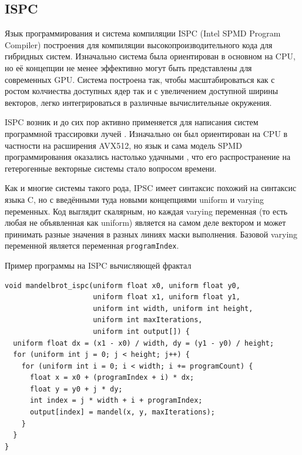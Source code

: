 \subsection{ISPC}\label{subsec:overview/vectorapi/ispc}

Язык программирования и система компиляции ISPC (Intel SPMD Program Compiler) построения для компиляции высокопроизводительного кода для гибридных систем. Изначально система была ориентирован в основном на CPU, но её концепции не менее эффективно могут быть представлены для современных GPU. Система построена так, чтобы масштабироваться как с ростом колчиества доступных ядер так и с увеличением доступной ширины векторов, легко интегрироваться в различные вычислительные окружения.

ISPC возник и до сих пор активно применяется для написания систем программной трассировки лучей \cite{moreau2019dynamic}. Изначально он был ориентирован на CPU \cite{pharr2013ray} в частности на расширения AVX512, но язык и сама модель SPMD программирования оказались настолько удачными \cite{pharr2018guest}, что его распространение на гетерогенные векторные системы стало вопросом времени.

Как и многие системы такого рода, IPSC имеет синтаксис похожий на синтаксис языка C, но с введёнными туда новыми концепциями uniform и varying переменных. Код выглядит скалярным, но каждая varying переменная (то есть любая не объявленная как uniform) является на самом деле вектором и может принимать разные значения в разных линиях маски выполнения. Базовой varying переменной является переменная \lstinline!programIndex!.

\begin{ListingEnv}[!h]
    \captiondelim{ } 
    \caption{Пример программы на ISPC вычисляющей фрактал}\label{lst:ispcmandel}
    \begin{lstlisting}[language={[ISO]C++}]
void mandelbrot_ispc(uniform float x0, uniform float y0,
                     uniform float x1, uniform float y1,
                     uniform int width, uniform int height,
                     uniform int maxIterations,
                     uniform int output[]) {
  uniform float dx = (x1 - x0) / width, dy = (y1 - y0) / height;
  for (uniform int j = 0; j < height; j++) {
    for (uniform int i = 0; i < width; i += programCount) {
      float x = x0 + (programIndex + i) * dx;
      float y = y0 + j * dy;
      int index = j * width + i + programIndex;
      output[index] = mandel(x, y, maxIterations);
    }
  }
}
    \end{lstlisting}
\end{ListingEnv}

